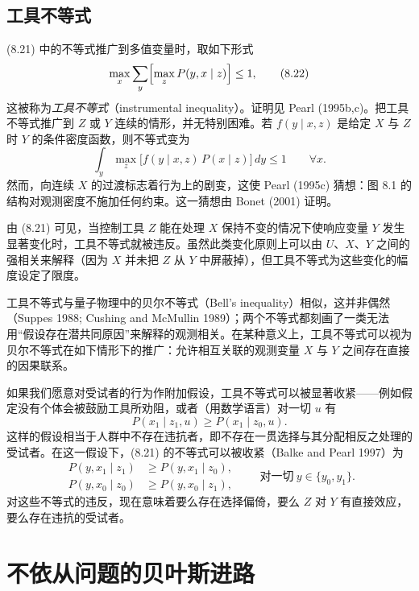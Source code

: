 \subsection*{工具不等式}

\textup{(8.21)} 中的不等式推广到多值变量时，取如下形式
\begin{equation}
\max_{x}\sum_{y}\Bigl[\max_{z}P(y,x\mid z)\Bigr]\le 1, \tag{8.22}
\end{equation}
这被称为\emph{工具不等式}（instrumental inequality）。证明见 Pearl (1995b,c)。把工具不等式推广到 $Z$ 或 $Y$ 连续的情形，并无特别困难。若 $f(y\mid x,z)$ 是给定 $X$ 与 $Z$ 时 $Y$ 的条件密度函数，则不等式变为
\begin{equation}
\int_{y}\max_{z}\bigl[f(y\mid x,z)\,P(x\mid z)\bigr]\,dy\le 1\qquad\forall x. \tag{8.23}
\end{equation}
然而，向连续 $X$ 的过渡标志着行为上的剧变，这使 Pearl (1995c) 猜想：图 8.1 的结构对观测密度不施加任何约束。这一猜想由 Bonet (2001) 证明。

由 \textup{(8.21)} 可见，当控制工具 $Z$ 能在处理 $X$ 保持不变的情况下使响应变量 $Y$ 发生显著变化时，工具不等式就被违反。虽然此类变化原则上可以由 $U$、$X$、$Y$ 之间的强相关来解释（因为 $X$ 并未把 $Z$ 从 $Y$ 中屏蔽掉），但工具不等式为这些变化的幅度设定了限度。

工具不等式与量子物理中的贝尔不等式（Bell's inequality）相似，这并非偶然（Suppes 1988; Cushing and McMullin 1989）；两个不等式都刻画了一类无法用“假设存在潜共同原因”来解释的观测相关。在某种意义上，工具不等式可以视为贝尔不等式在如下情形下的推广：允许相互关联的观测变量 $X$ 与 $Y$ 之间存在直接的因果联系。

如果我们愿意对受试者的行为作附加假设，工具不等式可以被显著收紧——例如假定没有个体会被鼓励工具所劝阻，或者（用数学语言）对一切 $u$ 有
\[
P(x_1\mid z_1,u)\ge P(x_1\mid z_0,u).
\]
这样的假设相当于人群中不存在违抗者，即不存在一贯选择与其分配相反之处理的受试者。在这一假设下，\textup{(8.21)} 的不等式可以被收紧（Balke and Pearl 1997）为
\begin{equation}
\begin{aligned}
P(y,x_1\mid z_1)&\ge P(y,x_1\mid z_0),\\
P(y,x_0\mid z_0)&\ge P(y,x_0\mid z_1),
\end{aligned}\qquad\text{对一切}\ y\in\{y_0,y_1\}. \tag{8.24}
\end{equation}
对这些不等式的违反，现在意味着要么存在选择偏倚，要么 $Z$ 对 $Y$ 有直接效应，要么存在违抗的受试者。

\section{不依从问题的贝叶斯进路}

